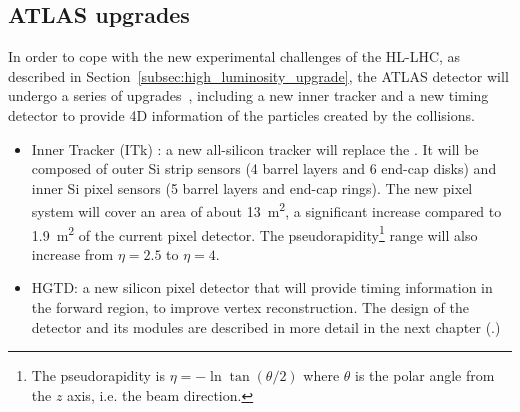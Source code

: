 \subsection{ATLAS upgrades}\label{subsec:ATLAS_upgrades}

In order to cope with the new experimental challenges of the HL-LHC, as described in Section~\ref{subsec:high_luminosity_upgrade}, the ATLAS detector will undergo a series of upgrades~\cite{MANGHI2024169917}, including a new inner tracker and a new timing detector to provide 4D information of the particles created by the collisions.

\begin{itemize}
    \item Inner Tracker (ITk) \cite{Buttar:2024imj}: a new all-silicon tracker will replace the . It will be composed of outer Si strip sensors (4 barrel layers and 6 end-cap disks) and inner Si pixel sensors (5 barrel layers and end-cap rings). The new pixel system will cover an area of about \qty{13}{\meter^2}, a significant increase compared to \qty{1.9}{\meter^2} of the current pixel detector. The pseudorapidity\footnote{The pseudorapidity is \(\eta=-\ln \tan(\theta/2)\) where \(\theta\) is the polar angle from the \(z\) axis, i.e. the beam direction.} range will also increase from \(\eta=2.5\) to \(\eta=4\).
    \item HGTD: a new silicon pixel detector that will provide timing information in the forward region, to improve vertex reconstruction. The design of the detector and its modules are described in more detail in the next chapter (.)
\end{itemize}

